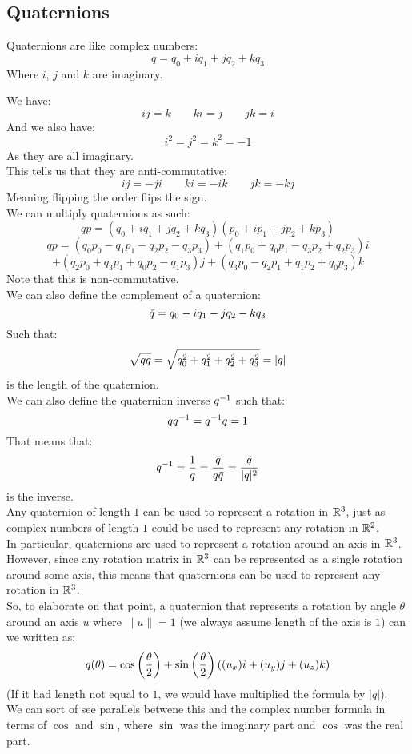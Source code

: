 \documentclass[12pt]{article}
\begin{document}
\newpage

\subsection*{Quaternions}

Quaternions are like complex numbers:
\[ q = q_0 + iq_1 + jq_2 + kq_3 \]
Where $i$, $j$ and $k$ are imaginary.

We have:
\[ ij = k \qquad ki = j \qquad jk = i \]
And we also have:
\[ i^2 = j^2 = k^2 = -1 \]
As they are all imaginary. \\

This tells us that they are anti-commutative:
\[ ij = -ji \qquad ki = -ik \qquad jk = -kj \]
Meaning flipping the order flips the sign. \\

We can multiply quaternions as such:
\[ qp = (q_0 + iq_1 + jq_2 + kq_3)
(p_0 + ip_1 + jp_2 + kp_3) \]
\[ qp = (q_0p_0 - q_1p_1 - q_2p_2 - q_3p_3) 
+ (q_1p_0 + q_0p_1 - q_3p_2 + q_2p_3)i \]
\[ + (q_2p_0 + q_3p_1 + q_0p_2 - q_1p_3)j 
+ (q_3p_0 - q_2p_1 + q_1p_2 + q_0p_3)k \]
Note that this is non-commutative. \\

We can also define the complement of a quaternion:
\[ \,\overline{\!{q}} = q_0 - iq_1 - jq_2 - kq_3 \]
Such that:
\[ \sqrt{q\,\overline{\!{q}}} 
= \sqrt{q_0^2 + q_1^2 + q_2^2 + q_3^2} = |q| \]
is the length of the quaternion. \\

We can also define the quaternion inverse $q^{-1}$
such that:
\[ qq^{-1} = q^{-1} q = 1 \]
That means that:
\[ q^{-1} = \dfrac{1}{q}
= \dfrac{\,\overline{\!{q}}}{q\,\overline{\!{q}}}
= \dfrac{\,\overline{\!{q}}}{|q|^2} \]
is the inverse. \\

Any quaternion of length $1$ can be used
to represent a rotation in $\mathbb{R}^3$,
just as complex numbers of length $1$
could be used to represent any 
rotation in $\mathbb{R}^2$. \\
In particular, quaternions are used
to represent a rotation around an axis in $\mathbb{R}^3$.
However, since any rotation matrix in $\mathbb{R}^3$
can be represented as a single rotation
around some axis,
this means that quaternions can be used
to represent any rotation in $\mathbb{R}^3$. \\

So, to elaborate on that point,
a quaternion that represents a rotation
by angle $\theta$
around an axis $u$ where $\|u\| = 1$
(we always assume length of the axis is $1$)
can we written as:
\[ q(\theta) = \cos \left( \dfrac{\theta}{2} \right)
+ \sin \left( \dfrac{\theta}{2} \right)
((u_x)i + (u_y)j + (u_z)k) \]
(If it had length not equal to $1$,
we would have multiplied the formula by $|q|$). \\
We can sort of see parallels
betwene this and the complex number
formula in terms of $\cos$ and $\sin$,
where $\sin$ was the imaginary part and
$\cos$ was the real part. \\
\end{document}

